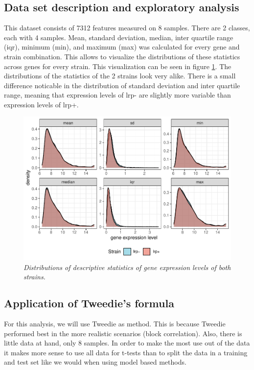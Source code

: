 \documentclass[
]{article}
\begin{document}
\hypertarget{data-set-description-and-exploratory-analysis}{%
\subsection{Data set description and exploratory analysis}\label{data-set-description-and-exploratory-analysis}}

This dataset consists of 7312 features measured on 8 samples. There are 2 classes, each with 4 samples. Mean, standard deviation, median, inter quartile range (iqr), minimum (min), and maximum (max) was calculated for every gene and strain combination. This allows to visualize the distributions of these statistics across genes for every strain. This visualization can be seen in figure \ref{fig:descriptives}. The distributions of the statistics of the 2 strains look very alike. There is a small difference noticable in the distribution of standard deviation and inter quartile range, meaning that expression levels of lrp- are slightly more variable than expression levels of lrp+.

\begin{figure}

{\centering \includegraphics[width=0.75\linewidth]{main_files/figure-latex/descriptives-1} 

}

\caption{\textit{Distributions of descriptive statistics of gene expression levels of both strains.}}\label{fig:descriptives}
\end{figure}

\hypertarget{application-of-tweedies-formula}{%
\subsection{Application of Tweedie's formula}\label{application-of-tweedies-formula}}

For this analysis, we will use Tweedie as method. This is because Tweedie performed best in the more realistic scenarios (block correlation). Also, there is little data at hand, only 8 samples. In order to make the most use out of the data it makes more sense to use all data for t-tests than to split the data in a training and test set like we would when using model based methods.
\end{document}
